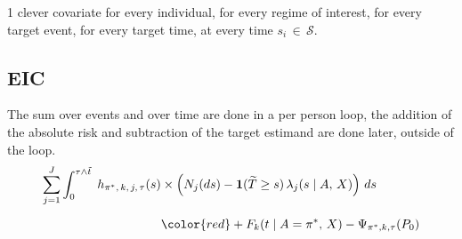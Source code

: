 \documentclass{report}
\newcommand{\1}{\ensuremath{\mathbf{1}}}
\newcommand{\T}{\ensuremath{\widetilde{T}}}
\newcommand{\X}{\ensuremath{{X}}}
\newcommand{\AX}{\ensuremath{\mid A,\,{X}}}
\newcommand{\trt}{\ensuremath{\pi^*}}
\newcommand{\tk}{\ensuremath{\tau}}
\newcommand{\jj}{\ensuremath{k}}
\begin{document}
1 clever covariate for every individual, for every regime of interest, for every target event, for every target time, at every time \(s_i \,\in\, \mathcal{S}\).

\subsection*{EIC}
\label{sec:org65b4a43}
The sum over events and over time are done in a per person loop, the addition of the absolute risk and subtraction of the target estimand are done later, outside of the loop.
\begin{align*}
    \sum_{j = 1}^{J} \int_{0}^{\tk \wedge \Tilde{t}} \;  h_{\trt,\, \jj,\, j,\, \tk}(s) &\times \left(N_j(ds) - \1(\T \geq s)\,\lambda_j(s \AX)\right) \,ds\\[2mm]
    &{\color{red}+ F_\jj(t \mid A = \trt,\,\X) - \Psi_{\trt, \jj, \tk}(P_0)}
\end{align*}
\end{document}
